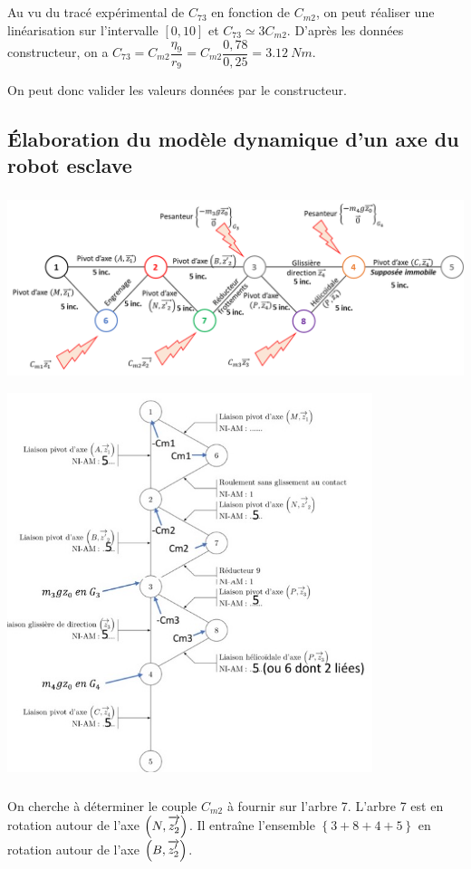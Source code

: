 \documentclass[10pt,fleqn]{article} %
\begin{document}
\subparagraph{}%
Au vu du tracé expérimental de $C_{73}$ en fonction de $C_{m2}$, on peut réaliser une linéarisation sur l'intervalle $[0,10]$ et $C_{73}\simeq 3 C_{m2}$. 
D'après les données constructeur, on a $C_{73}=C_{m2}\dfrac{\eta_9}{r_9}=C_{m2}\dfrac{0,78}{0,25}=\SI{3,12}{Nm}$.

On peut donc valider les valeurs données par le constructeur.
\subsection{Élaboration du modèle dynamique d’un axe du robot esclave}


\subparagraph{}%
\begin{center}
\includegraphics[width=\textwidth]{images/fig_02}
\end{center}

\begin{center}
\includegraphics[width=0.8\textwidth]{images/graphe_structure_complet.jpg}
\end{center}
\subparagraph{}%
On cherche à déterminer le couple $C_{m2}$ à fournir sur l'arbre 7. L'arbre 7 est en rotation autour de l'axe $\left(N,\overrightarrow{z_2'}\right)$. Il entraîne l'ensemble $\left\{3+8+4+5\right\}$ en rotation autour de l'axe $\left(B,\overrightarrow{z_2'}\right)$.
\end{document}
